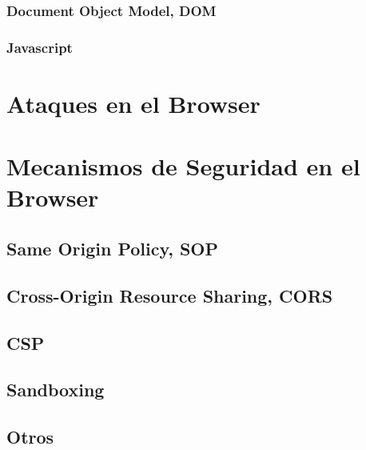 \subsubsection{Document Object Model, DOM}
\label{sec:chap2.1.1.2}


\subsubsection{Javascript}
\label{sec:chap2.1.1.3}



\section{Ataques en el Browser}
\label{sec:chap2.2}


\section{Mecanismos de Seguridad en el Browser}
\label{sec:chap2.3}


\subsection{Same Origin Policy, SOP}
\label{sec:chap2.3.1}


\subsection{Cross-Origin Resource Sharing, CORS}
\label{sec:chap2.3.2}


\subsection{CSP}
\label{sec:chap2.3.3}


\subsection{Sandboxing}
\label{sec:chap2.3.4}


\subsection{Otros}
\label{sec:chap2.3.5}




%
